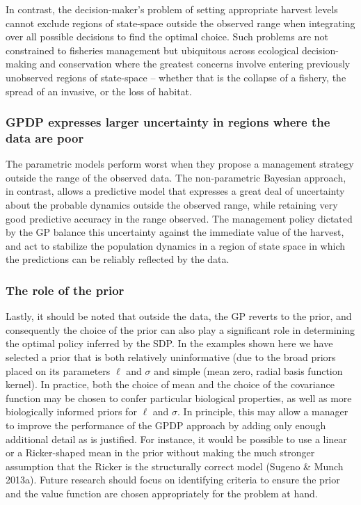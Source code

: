 \documentclass[author-year, 12pt,review]{elsarticle} %
\begin{document}
In contrast, the decision-maker's problem of setting appropriate harvest
levels cannot exclude regions of state-space outside the observed range
when integrating over all possible decisions to find the optimal choice.
Such problems are not constrained to fisheries management but ubiquitous
across ecological decision-making and conservation where the greatest
concerns involve entering previously unobserved regions of state-space
-- whether that is the collapse of a fishery, the spread of an invasive,
or the loss of habitat.

\subsubsection{GPDP expresses larger uncertainty in regions where the
data are
poor}\label{gpdp-expresses-larger-uncertainty-in-regions-where-the-data-are-poor}

The parametric models perform worst when they propose a management
strategy outside the range of the observed data. The non-parametric
Bayesian approach, in contrast, allows a predictive model that expresses
a great deal of uncertainty about the probable dynamics outside the
observed range, while retaining very good predictive accuracy in the
range observed. The management policy dictated by the GP balance this
uncertainty against the immediate value of the harvest, and act to
stabilize the population dynamics in a region of state space in which
the predictions can be reliably reflected by the data.

\subsubsection{The role of the prior}\label{the-role-of-the-prior}

Lastly, it should be noted that outside the data, the GP reverts to the
prior, and consequently the choice of the prior can also play a
significant role in determining the optimal policy inferred by the SDP.
In the examples shown here we have selected a prior that is both
relatively uninformative (due to the broad priors placed on its
parameters $\ell$ and $\sigma$ and simple (mean zero, radial basis
function kernel). In practice, both the choice of mean and the choice of
the covariance function may be chosen to confer particular biological
properties, as well as more biologically informed priors for $\ell$ and
$\sigma$. In principle, this may allow a manager to improve the
performance of the GPDP approach by adding only enough additional detail
as is justified. For instance, it would be possible to use a linear or a
Ricker-shaped mean in the prior without making the much stronger
assumption that the Ricker is the structurally correct model (Sugeno \&
Munch 2013a). Future research should focus on identifying criteria to
ensure the prior and the value function are chosen appropriately for the
problem at hand.
\end{document}
